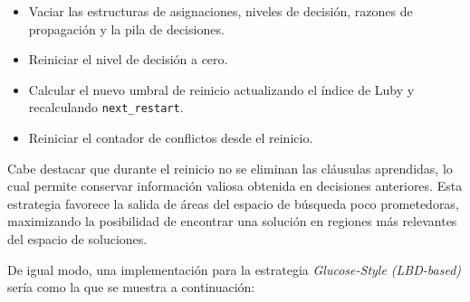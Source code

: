 \begin{itemize}
    \item Vaciar las estructuras de asignaciones, niveles de decisión, razones de propagación y la pila de decisiones.
    \item Reiniciar el nivel de decisión a cero.
    \item Calcular el nuevo umbral de reinicio actualizando el índice de Luby y recalculando \texttt{next\_restart}.
    \item Reiniciar el contador de conflictos desde el reinicio.
\end{itemize}

Cabe destacar que durante el reinicio no se eliminan las cláusulas aprendidas, lo cual permite conservar información valiosa obtenida en decisiones anteriores. Esta estrategia favorece la salida de áreas del espacio de búsqueda poco prometedoras, maximizando la posibilidad de encontrar una solución en regiones más relevantes del espacio de soluciones.


De igual modo, una implementación para la estrategia \textit{Glucose-Style (LBD-based)} sería como la que se muestra a continuación:

